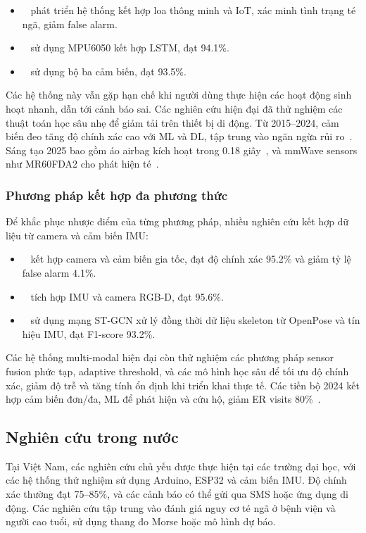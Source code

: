 \begin{itemize}
    \item ~\cite{xu2023} phát triển hệ thống kết hợp loa thông minh và IoT, xác minh tình trạng té ngã, giảm false alarm.  
    \item ~\cite{hussain2019} sử dụng MPU6050 kết hợp LSTM, đạt 94.1\%.  
    \item ~\cite{alarifi2021} sử dụng bộ ba cảm biến, đạt 93.5\%.  
\end{itemize}

Các hệ thống này vẫn gặp hạn chế khi người dùng thực hiện các hoạt động sinh hoạt nhanh, dẫn tới cảnh báo sai. Các nghiên cứu hiện đại đã thử nghiệm các thuật toán học sâu nhẹ để giảm tải trên thiết bị di động. Từ 2015--2024, cảm biến đeo tăng độ chính xác cao với ML và DL, tập trung vào ngăn ngừa rủi ro~\cite{wearable20152024}. Sáng tạo 2025 bao gồm áo airbag kích hoạt trong 0.18 giây~\cite{airbag2025}, và mmWave sensors như MR60FDA2 cho phát hiện té~\cite{mmwave2025}.

\subsubsection{Phương pháp kết hợp đa phương thức}
Để khắc phục nhược điểm của từng phương pháp, nhiều nghiên cứu kết hợp dữ liệu từ camera và cảm biến IMU:

\begin{itemize}
    \item ~\cite{rougier2011} kết hợp camera và cảm biến gia tốc, đạt độ chính xác 95.2\% và giảm tỷ lệ false alarm 4.1\%.  
    \item ~\cite{liu2018} tích hợp IMU và camera RGB-D, đạt 95.6\%.  
    \item ~\cite{keskes2021} sử dụng mạng ST-GCN xử lý đồng thời dữ liệu skeleton từ OpenPose và tín hiệu IMU, đạt F1-score 93.2\%.  
\end{itemize}

Các hệ thống multi-modal hiện đại còn thử nghiệm các phương pháp sensor fusion phức tạp, adaptive threshold, và các mô hình học sâu để tối ưu độ chính xác, giảm độ trễ và tăng tính ổn định khi triển khai thực tế. Các tiến bộ 2024 kết hợp cảm biến đơn/đa, ML để phát hiện và cứu hộ, giảm ER visits 80\%~\cite{multimodal2024}.

\subsection{Nghiên cứu trong nước}
Tại Việt Nam, các nghiên cứu chủ yếu được thực hiện tại các trường đại học, với các hệ thống thử nghiệm sử dụng Arduino, ESP32 và cảm biến IMU. Độ chính xác thường đạt 75--85\%, và các cảnh báo có thể gửi qua SMS hoặc ứng dụng di động. Các nghiên cứu tập trung vào đánh giá nguy cơ té ngã ở bệnh viện và người cao tuổi, sử dụng thang đo Morse hoặc mô hình dự báo.

